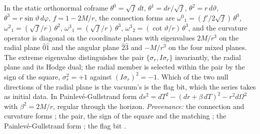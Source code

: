In the static orthonormal coframe $\theta^{0} = \sqrt f\,dt$, $\theta^{1} = dr/\sqrt f$, $\theta^{2} = r\,d\vartheta$, $\theta^{3} = r\sin\vartheta\,d\varphi$, $f = 1 - 2M/r$, the connection forms are $\omega^{0}{}_{1} = (f'/2\sqrt f)\,\theta^{0}$, $\omega^{2}{}_{1} = (\sqrt f/r)\,\theta^{2}$, $\omega^{3}{}_{1} = (\sqrt f/r)\,\theta^{3}$, $\omega^{3}{}_{2} = (\cot\vartheta/r)\,\theta^{3}$, and the curvature operator is diagonal on the coordinate planes with eigenvalues $2M/r^{3}$ on the radial plane $\hat0\hat1$ and the angular plane $\hat2\hat3$ and $-M/r^{3}$ on the four mixed planes. The extreme eigenvalue distinguishes the pair $\{\sigma_{r}, I\sigma_{r}\}$ invariantly, the radial plane and its Hodge dual; the radial member is selected within the pair by the sign of the square, $\sigma_{r}^{2} = +1$ against $(I\sigma_{r})^{2} = -1$. Which of the two null directions of the radial plane is the vacuum's is the flag bit, which the series takes as initial data. In Painlev\'e-Gullstrand form $ds^{2} = dT^{2} - (dr + \beta\,dT)^{2} - r^{2}d\Omega^{2}$ with $\beta^{2} = 2M/r$, regular through the horizon. \emph{Provenance:} the connection and curvature forms \cite[App.~A.2]{ButlerT5}; the pair, the sign of the square and the matching \cite[Thm.~6.1, Prop.~7.21(3)]{ButlerT5}; the Painlev\'e-Gullstrand form \cite[App.~A.1]{ButlerT5}; the flag bit \cite[Def.~2.10, Prop.~5.1]{ButlerT14}.
